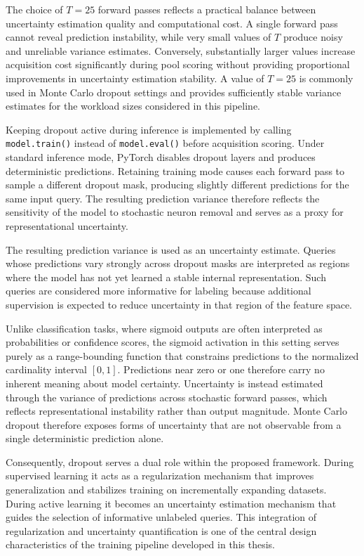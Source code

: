The choice of $T=25$ forward passes reflects a practical balance between uncertainty estimation quality and computational cost. A single forward pass cannot reveal prediction instability, while very small values of $T$ produce noisy and unreliable variance estimates. Conversely, substantially larger values increase acquisition cost significantly during pool scoring without providing proportional improvements in uncertainty estimation stability. A value of $T=25$ is commonly used in Monte Carlo dropout settings and provides sufficiently stable variance estimates for the workload sizes considered in this pipeline.

Keeping dropout active during inference is implemented by calling \texttt{model.train()} instead of \texttt{model.eval()} before acquisition scoring. Under standard inference mode, PyTorch disables dropout layers and produces deterministic predictions. Retaining training mode causes each forward pass to sample a different dropout mask, producing slightly different predictions for the same input query. The resulting prediction variance therefore reflects the sensitivity of the model to stochastic neuron removal and serves as a proxy for representational uncertainty.

The resulting prediction variance is used as an uncertainty estimate. Queries whose predictions vary strongly across dropout masks are interpreted as regions where the model has not yet learned a stable internal representation. Such queries are considered more informative for labeling because additional supervision is expected to reduce uncertainty in that region of the feature space.

Unlike classification tasks, where sigmoid outputs are often interpreted as probabilities or confidence scores, the sigmoid activation in this setting serves purely as a range-bounding function that constrains predictions to the normalized cardinality interval $[0,1]$. Predictions near zero or one therefore carry no inherent meaning about model certainty. Uncertainty is instead estimated through the variance of predictions across stochastic forward passes, which reflects representational instability rather than output magnitude. Monte Carlo dropout therefore exposes forms of uncertainty that are not observable from a single deterministic prediction alone.

Consequently, dropout serves a dual role within the proposed framework. During supervised learning it acts as a regularization mechanism that improves generalization and stabilizes training on incrementally expanding datasets. During active learning it becomes an uncertainty estimation mechanism that guides the selection of informative unlabeled queries. This integration of regularization and uncertainty quantification is one of the central design characteristics of the training pipeline developed in this thesis.


